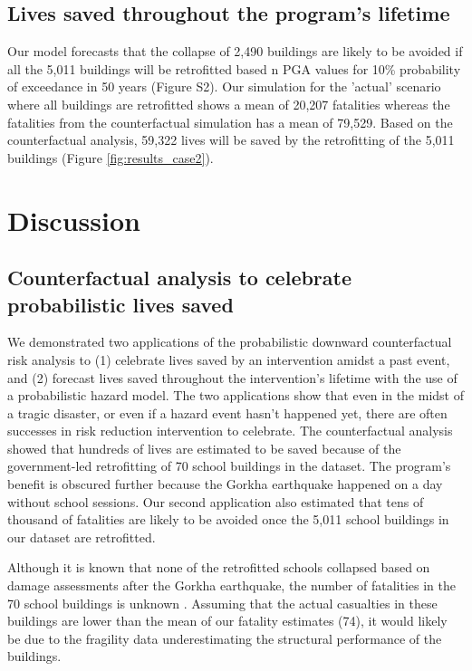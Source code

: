 \documentclass[utf8]{frontiersSCNS} %
\begin{document}
\subsection{Lives saved throughout the program's lifetime}

Our model forecasts that the collapse of 2,490 buildings are likely to be avoided if all the 5,011 buildings will be retrofitted based n PGA values for 10\% probability of exceedance in 50 years (Figure S2). Our simulation for the 'actual' scenario where all buildings are retrofitted shows a mean of 20,207 fatalities whereas the fatalities from the counterfactual simulation has a mean of 79,529. Based on the counterfactual analysis, 59,322 lives will be saved by the retrofitting of the 5,011 buildings (Figure \ref{fig:results_case2}).


\section{Discussion}
\label{section-discuss}
\subsection{Counterfactual analysis to celebrate probabilistic lives saved}

We demonstrated two applications of the probabilistic downward counterfactual risk analysis to (1) celebrate lives saved by an intervention amidst a past event, and (2) forecast lives saved throughout the intervention's lifetime with the use of a probabilistic hazard model. The two applications show that even in the midst of a tragic disaster, or even if a hazard event hasn't happened yet, there are often successes in risk reduction intervention to celebrate. The counterfactual analysis showed that hundreds of lives are estimated to be saved because of the government-led retrofitting of 70 school buildings in the dataset. The program's benefit is obscured further because the Gorkha earthquake happened on a day without school sessions. Our second application also estimated that tens of thousand of fatalities are likely to be avoided once the 5,011 school buildings in our dataset are retrofitted. 

Although it is known that none of the retrofitted schools collapsed based on damage assessments after the Gorkha earthquake, the number of fatalities in the 70 school buildings is unknown \citep{marasini_2019}. Assuming that the actual casualties in these buildings are lower than the mean of our fatality estimates (74), it would likely be due to the fragility data underestimating the structural performance of the buildings.
\end{document}
